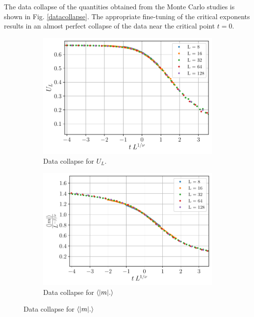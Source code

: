 \documentclass[../thesis_main.tex]{subfiles}
\begin{document}
The data collapse of the quantities obtained from the Monte Carlo studies is shown in Fig. \ref{datacollapse}. The appropriate fine-tuning of the critical exponents results in an almost perfect collapse of the data near the critical point $t = 0$.
\begin{figure}[!htb]
    \centering
    \begin{subfigure}[b]{0.49\textwidth}  %
        \centering
        \includegraphics[width=\textwidth]{images/data collapse/U_L data collapse.pdf}
        \caption{Data collapse for $U_L$.}
        \label{U_L collapse}
    \end{subfigure}
    \begin{subfigure}[b]{0.49\textwidth}
        \centering
        \includegraphics[width=\textwidth]{images/data collapse/abs(mag) data collapse.pdf}
        \caption{Data collapse for $\expval{\abs{m}.}$}
    \end{subfigure}
\end{figure}
\end{document}
